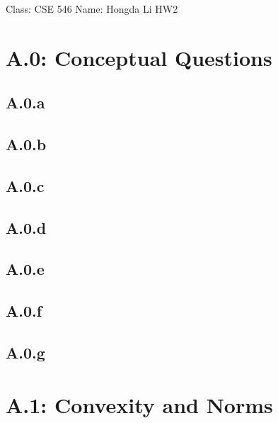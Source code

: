 \documentclass[]{article}
\begin{document}
\begin{center}
    Class: CSE 546 \quad Name: Hongda Li \quad HW2
\end{center}

\section*{A.0: Conceptual Questions}
    \subsection*{A.0.a}    
    \subsection*{A.0.b}
    \subsection*{A.0.c}
    \subsection*{A.0.d}
    \subsection*{A.0.e}
    \subsection*{A.0.f}
    \subsection*{A.0.g}

\section*{A.1: Convexity and Norms}
\end{document}
